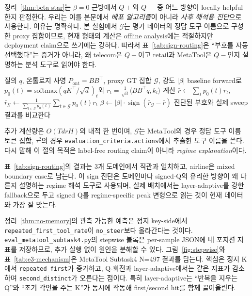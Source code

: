 정리~\ref{thm:beta-star}는 $\beta=0$ 근방에서 $Q+$와 $Q-$ 중 어느 방향이 locally helpful한지 판정한다. 우리는 이를 본문에서 \emph{배포 알고리즘}이 아니라 \emph{사후 해석용 진단}으로 사용한다. 이유는 명확하다. 본 실험에서 $\mathcal{G}$는 평가 데이터의 정답 도구 이름으로 구성한 proxy 집합이므로, 현재 형태의 계산은 offline analysis에는 적절하지만 deployment claim으로 쓰기에는 강하다. 따라서 표~\ref{tab:sign-routing}은 ``부호를 자동 선택했다''는 증거가 아니라, 왜 telecom은 $Q+$이고 retail과 MetaTool은 $Q-$인지 설명하는 분석 도구로 읽어야 한다.

\begin{algorithm}[h]
\caption{Signed Q 부호 진단 (offline analysis)}\label{alg:asr}
\begin{algorithmic}[1]
\REQUIRE 질의 $q$, 온톨로지 사영 $P_{\mathrm{ont}} = BB^\top$, proxy GT 집합 $\mathcal{G}$, 강도 $|\beta|$
\STATE baseline forward로 $p_0(t) = \mathrm{softmax}(qK^\top/\sqrt d)_t$와 $r_t = \tfrac{1}{\sqrt d}\langle BB^\top q, k_t\rangle$ 계산
\STATE $\bar r \leftarrow \sum_t p_0(t) r_t$,\quad $\bar r_{\mathcal{G}} \leftarrow \frac{1}{\sum_{t\in\mathcal{G}} p_0(t)}\sum_{t\in\mathcal{G}} p_0(t) r_t$
\STATE $\beta \leftarrow |\beta| \cdot \operatorname{sign}(\bar r_{\mathcal{G}} - \bar r)$
\STATE 진단된 부호와 실제 sweep 결과를 비교한다
\end{algorithmic}
\end{algorithm}

추가 계산량은 $O(TdrH)$의 내적 한 번이며, $\mathcal{G}$는 MetaTool의 경우 정답 도구 이름 토큰 집합, $\tau^2$의 경우 \texttt{evaluation\_criteria.actions}에서 추출한 도구 이름을 쓴다. 다시 말해 이 절의 목적은 label-free routing claim이 아니라 \emph{regime explanation}이다.

표~\ref{tab:sign-routing}의 결과는 3개 도메인에서 직관과 일치하고, airline은 mixed boundary case로 남는다. 이 sign 진단은 도메인마다 signed-Q의 유리한 방향이 왜 다른지 설명하는 regime 해석 도구로 사용되며, 실제 배치에서는 layer-adaptive를 강한 fallback으로 두고 signed Q를 regime-specific peak 변형으로 읽는 것이 현재 데이터와 가장 잘 맞는다.

정리~\ref{thm:no-memory}의 관측 가능한 예측은 정지 key-side에서 \texttt{repeated\_first\_tool\_rate}이 \texttt{no\_steer}보다 올라간다는 것이다. \texttt{eval\_metatool\_subtask4.py}의 stepwise 블록은 per-sample JSON에 네 포지션 지표를 저장하므로, 추가 실행 없이 원인을 분해할 수 있다. 그림~\ref{fig:stepwise}와 표~\ref{tab:e3-mechanism}은 MetaTool Subtask4 N=497 결과를 담는다. 핵심은 정지 K에서 \texttt{repeated\_first}가 증가하고, Q-회전과 layer-adaptive에서는 같은 지표가 감소하며 \texttt{second\_distinct}가 오른다는 점이다. 특히 layer-adaptive는 ``반복을 지우는 Q''와 ``초기 각인을 주는 K''가 동시에 작동해 first/second hit를 함께 끌어올린다.

